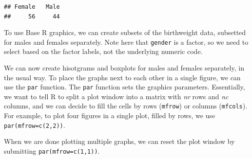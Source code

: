 \documentclass[
]{memoir}
\newenvironment{Shaded}{\begin{snugshade}}{\end{snugshade}}
\newcommand{\FunctionTok}[1]{\textcolor[rgb]{0.00,0.00,0.00}{#1}}
\newcommand{\NormalTok}[1]{#1}
\newcommand{\OtherTok}[1]{\textcolor[rgb]{0.56,0.35,0.01}{#1}}
\newcommand{\SpecialCharTok}[1]{\textcolor[rgb]{0.00,0.00,0.00}{#1}}
\newcommand{\StringTok}[1]{\textcolor[rgb]{0.31,0.60,0.02}{#1}}
\begin{document}
\begin{Shaded}
\end{Shaded}

\begin{verbatim}
## Female   Male 
##     56     44
\end{verbatim}

To use Base R graphics, we can create subsets of the birthweight data, subsetted for males and females separately. Note here that \texttt{gender} is a factor, so we need to select based on the factor labels, not the underlying numeric code.

\begin{Shaded}
\end{Shaded}

We can now create hisotgrams and boxplots for males and females separately, in the usual way. To place the graphs next to each other in a single figure, we can use the \texttt{par} function. The \texttt{par} function sets the graphics parameters. Essentially, we want to tell R to split a plot window into a matrix with \emph{nr} rows and \emph{nc} columns, and we can decide to fill the cells by rows (\texttt{mfrow}) or columns (\texttt{mfcols}). For example, to plot four figures in a single plot, filled by rows, we use \texttt{par(mfrow=c(2,2))}.

When we are done plotting multiple graphs, we can reset the plot window by submitting \texttt{par(mfrow=c(1,1))}.
\end{document}
